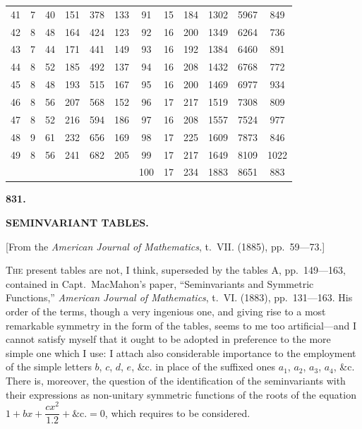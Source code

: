 \documentclass[12pt,a4paper]{article}
\theoremstyle{definition}
\begin{document}
\begin{center}
\begin{tabular}{|c|c|c|c|c|c||c|c|c|c|c|c|}
41 & 7 & 40 & 151 & 378 & 133 & 91 & 15 & 184 & 1302 & 5967 & 849 \\
42 & 8 & 48 & 164 & 424 & 123 & 92 & 16 & 200 & 1349 & 6264 & 736 \\
43 & 7 & 44 & 171 & 441 & 149 & 93 & 16 & 192 & 1384 & 6460 & 891 \\
44 & 8 & 52 & 185 & 492 & 137 & 94 & 16 & 208 & 1432 & 6768 & 772 \\
45 & 8 & 48 & 193 & 515 & 167 & 95 & 16 & 200 & 1469 & 6977 & 934 \\
46 & 8 & 56 & 207 & 568 & 152 & 96 & 17 & 217 & 1519 & 7308 & 809 \\
47 & 8 & 52 & 216 & 594 & 186 & 97 & 16 & 208 & 1557 & 7524 & 977 \\
48 & 9 & 61 & 232 & 656 & 169 & 98 & 17 & 225 & 1609 & 7873 & 846 \\
49 & 8 & 56 & 241 & 682 & 205 & 99 & 17 & 217 & 1649 & 8109 & 1022 \\
\hline
& & & & & & 100 & 17 & 234 & 1883 & 8651 & 883 \\
\hline
\end{tabular}
\end{center}

\newpage
\setcounter{page}{275}


\begin{center}
\Large\textbf{831.}

\bigskip

\Large\textbf{SEMINVARIANT TABLES.}
\end{center}

\begin{center}
[From the \textit{American Journal of Mathematics}, t.~VII. (1885), pp.~59---73.]
\end{center}

\noindent\textsc{The} present tables are not, I think, superseded by the tables A, pp.~149---163, contained in Capt.~MacMahon's paper, ``Seminvariants and Symmetric Functions,'' \textit{American Journal of Mathematics}, t.~VI. (1883), pp.~131---163. His order of the terms, though a very ingenious one, and giving rise to a most remarkable symmetry in the form of the tables, seems to me too artificial---and I cannot satisfy myself that it ought to be adopted in preference to the more simple one which I use: I attach also considerable importance to the employment of the simple letters $b$, $c$, $d$, $e$, \&c. in place of the suffixed ones $a_1$, $a_2$, $a_3$, $a_4$, \&c. There is, moreover, the question of the identification of the seminvariants with their expressions as non-unitary symmetric functions of the roots of the equation $1 + bx + \dfrac{cx^2}{1.2} + \&\text{c.} = 0$, which requires to be considered.
\end{document}
